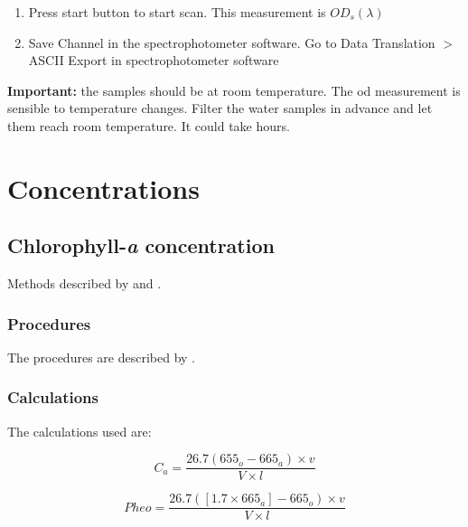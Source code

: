 \begin{appendices}
\begin{enumerate}[itemsep=2pt,parsep=2pt]
  \item Press start button to start scan. This measurement is $OD_s(\lambda)$
  \item Save Channel in the spectrophotometer software. Go to Data Translation $>$ ASCII Export in spectrophotometer software
\end{enumerate}
\textbf{Important:} the samples should be at room temperature. The \gls{od} measurement is sensible to temperature changes. Filter the water samples in advance and let them reach room temperature. It could take hours.

\section{Concentrations}
\subsection{Chlorophyll-{\it a} concentration}


Methods described by \cite{Lorenzen:1967fk} and \cite{Ritchie:2008eu}.
\subsubsection{Procedures}
The procedures are described by \cite{Tyler2013_chl_protocol}.

\subsubsection{Calculations}

The calculations used \cite{Lorenzen:1967fk} are:

\begin{equation}
  C_a = \frac{26.7(655_o - 665_a)\times v}{V\times l}
\end{equation}

\begin{equation}
  Pheo = \frac{26.7([1.7\times 665_a]-665_o)\times v}{V\times l}
\end{equation}


\end{appendices}
